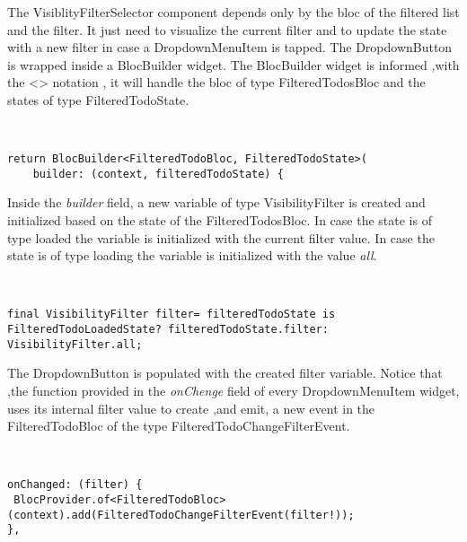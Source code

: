 The VisiblityFilterSelector component depends only by the bloc of the filtered list and the filter. It just need to visualize the current filter and to update the state with a new filter in case a DropdownMenuItem is tapped. The DropdownButton is  wrapped inside a BlocBuilder widget. The BlocBuilder widget is informed ,with the <> notation , it will handle the bloc of type FilteredTodosBloc and the states of type FilteredTodoState. 
\begin{code}
\mbox{}\\
 \mbox{}
\label{code:2.14}
\begin{verbatim}
return BlocBuilder<FilteredTodoBloc, FilteredTodoState>(
    builder: (context, filteredTodoState) {
\end{verbatim}
\mbox{}
\end{code}

Inside the \textit{builder }field, a new variable of type VisibilityFilter is created and initialized based on the state of the FilteredTodosBloc. In case the state is of type loaded the variable is initialized with the current filter value. In case the state is of type loading the variable is initialized with the value \textit{all}.
\begin{code}
\mbox{}\\
 \mbox{}
\label{code:2.14}
\begin{verbatim}
final VisibilityFilter filter= filteredTodoState is FilteredTodoLoadedState? filteredTodoState.filter: VisibilityFilter.all;
\end{verbatim}
\mbox{}
\end{code}

The DropdownButton is populated with the created filter variable. Notice that ,the function provided in the \textit{onChenge} field of every DropdownMenuItem widget, uses its internal filter value to create ,and  emit, a new event in the FilteredTodoBloc of the type FilteredTodoChangeFilterEvent.
\begin{code}
\mbox{}\\
 \mbox{}
\label{code:2.14}
\begin{verbatim}
onChanged: (filter) {
 BlocProvider.of<FilteredTodoBloc>(context).add(FilteredTodoChangeFilterEvent(filter!));
},
\end{verbatim}
\mbox{}
\end{code}
